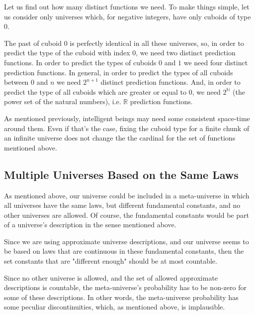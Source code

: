 \documentclass[a4paper
,draft
]{article}
\def\reale{\mathbb{R}}
\def\naturale{\mathbb{N}}
\newcommand{\ghilimele}[1]{``#1"}
\begin{document}
Let us find out how many distinct functions we need.
To make things simple, let us consider only universes which, for negative
integers, have only cuboids of type $0$.

The past of cuboid $0$ is perfectly identical in all these universes, so,
in order to predict the type of the cuboid with index $0$,
we need two distinct prediction functions.
In order to predict the types of cuboids $0$ and $1$ we need four
distinct prediction functions.
In general, in order to predict the types of all cuboids between $0$ and $n$
we need $2^{n+1}$ distinct prediction functions.
And, in order to predict the type of all cuboids which are greater or equal
to $0$, we need $2^\naturale$ (the power set of the natural numbers),
i.e. $\reale$ prediction functions.

As mentioned previously, intelligent beings may need some consistent space-time
around them. Even if that's the case, fixing the cuboid type for a finite
chunk of an infinite universe does not change the the cardinal for the set of
functions mentioned above.

\subsection {Multiple Universes Based on the Same Laws}

As mentioned above, our universe could be included in a meta-universe in which
all universes have the same laws, but different fundamental constants, and no
other universes are allowed.
Of course, the fundamental constants would be part of a universe's description
in the sense mentioned above.

Since we are using approximate universe descriptions, and our universe
seems to be based on laws that are continuous in these fundamental constants,
then the set constants that are "different enough" should be at most countable.

Since no other universe is allowed, and the set of allowed approximate
descriptions is countable, the meta-universe's probability
has to be non-zero for some of these descriptions. In other words, the
meta-universe probability has some peculiar discontinuities, which, as
mentioned above, is implausible.


\end{document}
